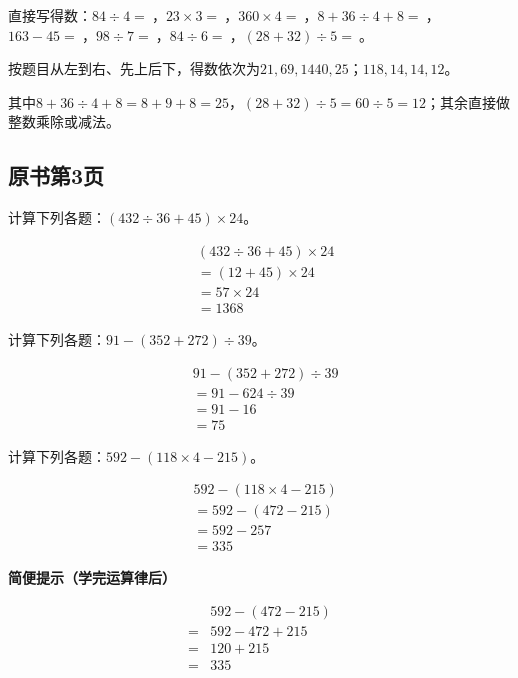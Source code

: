 直接写得数：\(84\div4=\ \)，\allowbreak{}\(23\times3=\ \)，\allowbreak{}\(360\times4=\ \)，\allowbreak{}\(8+36\div4+8=\ \)，\allowbreak{}\(163-45=\ \)，\allowbreak{}\(98\div7=\ \)，\allowbreak{}\(84\div6=\ \)，\allowbreak{}\((28+32)\div5=\ \)。\par
\begin{BookAnswer}
按题目从左到右、先上后下，得数依次为\(21,69,1440,25\)；\allowbreak{}\(118,14,14,12\)。\par 其中\(8+36\div4+8=8+9+8=25\)，\allowbreak{}\((28+32)\div5=60\div5=12\)；其余直接做整数乘除或减法。
\end{BookAnswer}



\subsection*{原书第3页}

计算下列各题：\((432\div36+45)\times24\)。\par
\begin{BookAnswer}
\[\begin{aligned}&(432\div36+45)\times24\\&=(12+45)\times24\\&=57\times24\\&=1368\end{aligned}\]
\end{BookAnswer}

计算下列各题：\(91-(352+272)\div39\)。\par
\begin{BookAnswer}
\[\begin{aligned}&91-(352+272)\div39\\&=91-624\div39\\&=91-16\\&=75\end{aligned}\]
\end{BookAnswer}

计算下列各题：\(592-(118\times4-215)\)。\par
\begin{BookAnswer}
\[\begin{aligned}&592-(118\times4-215)\\&=592-(472-215)\\&=592-257\\&=335\end{aligned}\]\par\textbf{简便提示（学完运算律后）}\par \[\begin{aligned}&592-(472-215)\\={}&592-472+215\\={}&120+215\\={}&335\end{aligned}\]
\end{BookAnswer}

